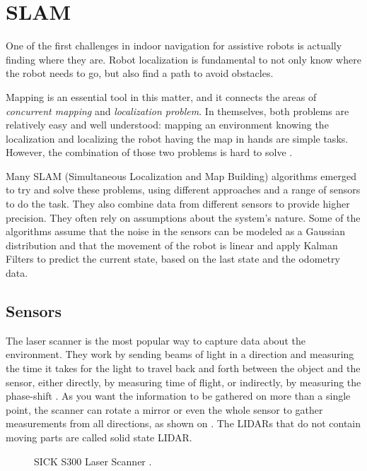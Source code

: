\chapter{SLAM}\label{chp:slam_mapping}

One of the first challenges in indoor navigation for assistive robots is actually finding where they are. Robot localization is fundamental to not only know where the robot needs to go, but also find a path to avoid obstacles.

Mapping is an essential tool in this matter, and it connects the areas of \textit{concurrent mapping} and \textit{localization problem}. In themselves, both problems are relatively easy and well understood: mapping an environment knowing the localization and localizing the robot having the map in hands are simple tasks. However, the combination of those two problems is hard to solve \cite{thrun2000real}.

Many SLAM (Simultaneous Localization and
Map Building) algorithms emerged to try and solve these problems, using different approaches and a range of sensors to do the task. They also combine data from different sensors to provide higher precision. They often rely on assumptions about the system's nature. Some of the algorithms assume that the noise in the sensors can be modeled as a Gaussian distribution and that the movement of the robot is linear and apply Kalman Filters to predict the current state, based on the last state and the odometry data.

\section{Sensors}

The laser scanner is the most popular way to capture data about the environment. They work by sending beams of light in a direction and measuring the time it takes for the light to travel back and forth between the object and the sensor, either directly, by measuring time of flight, or indirectly, by measuring the phase-shift \cite{amann2001laser}. As you want the information to be gathered on more than a single point, the scanner can rotate a mirror or even the whole sensor to gather measurements from all directions, as shown on . The LIDARs that do not contain moving parts are called solid state LIDAR.

\begin{figure}
     \centering
     \caption{SICK S300 Laser Scanner \cite{sicks300}.}
     \label{fig:sick_s300}
\end{figure}


